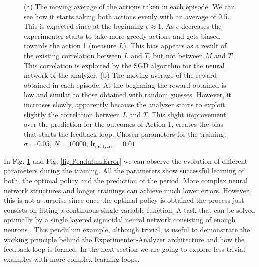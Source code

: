 \documentclass[11pt,a4paper,twoside]{report}
\newcommand{\+}{\textnormal{+} }
\theoremstyle{definition}
\numberwithin{equation}{chapter}
\begin{document}
\begin{figure}[h]
  \caption{(a) The moving average of the actions taken in each episode. We can
  see how it starts taking both actions evenly with an average of 0.5. This is
  expected since at the beginning $\epsilon \approx 1$. As $\epsilon$ decreases
  the experimenter starts to take more greedy actions and gets biased towards
  the action 1 (measure $L$). This bias appears as a result of the existing
  correlation between $L$ and $T$, but not between $M$ and $T$. This correlation
  is exploited by the SGD algorithm for the neural network of the analyzer. (b)
  The moving average of the reward obtained in each episode. At the beginning
  the reward obtained is low and similar to those obtained with random guesses.
  However, it increases slowly, apparently because the analyzer starts to
  exploit slightly the correlation between $L$ and $T$. This slight improvement
  over the prediction for the outcomes of Action 1, creates the bias that starts
  the feedback loop. Chosen parameters for the training: $\sigma=0.05$,
  $N=10000$, $\text{lr}_\text{analyzer}=0.01$}
  \label{fig:PendulumTraining}
  \end{figure}

  In Fig. \ref{fig:PendulumTraining} and Fig. \ref{fig:PendulumError} we can
  observe the evolution of different parameters during the training. All the
  parameters show successful learning of both, the optimal policy and the
  prediction of the period. More complex neural network structures and longer
  trainings can achieve much lower errors. However, this is not a surprise since
  once the optimal policy is obtained the process just consists on fitting a
  continuous single variable function. A task that can be solved optimally by a
  single layered sigmoidal neural network consisting of enough neurons
  \cite{cybenko1989approximation}. This pendulum example, although trivial, is
  useful to demonstrate the working principle behind the Experimenter-Analyzer
  architecture and how the feedback loop is formed. In the next section we are
  going to explore less trivial examples with more complex learning loops.
\end{document}
